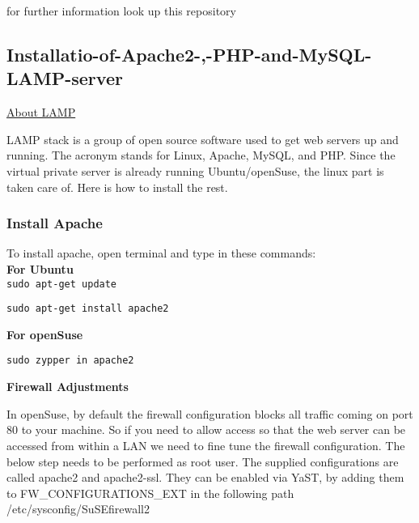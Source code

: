 \documentclass[16pt]{article}
\begin{document}
for further information look up this repository 
  
\hfill


\subsection{Installatio-of-Apache2-,-PHP-and-MySQL-LAMP-server}

\vspace{0.5cm}

{\underline{\Large{About LAMP}}}

  LAMP stack is a group of open source software used to get web servers up
  and running. The acronym stands for Linux, Apache, MySQL, and PHP. Since
  the virtual private server is already running Ubuntu/openSuse, the linux
  part is taken care of. Here is how to install the rest.


  
  

  

  \subsubsection{Install Apache}
  
  \hfill

  To install apache, open terminal and type in these commands: \\
  \textbf{For Ubuntu} \\
  \texttt{sudo apt-get update} 

  \texttt{sudo apt-get install apache2}

  \textbf{For openSuse}

  \texttt{sudo zypper in apache2}

  \textbf{Firewall Adjustments}

  In openSuse, by default the firewall configuration blocks all traffic
  coming on port 80 to your machine. So if you need to allow access so
  that the web server can be accessed from within a LAN we need to fine
  tune the firewall configuration. The below step needs to be performed as
  root user. The supplied configurations are called apache2 and
  apache2-ssl. They can be enabled via YaST, by adding them to
  FW\_CONFIGURATIONS\_EXT in the following path /etc/sysconfig/SuSEfirewall2
  
  \vspace{0.5cm}
\end{document}
